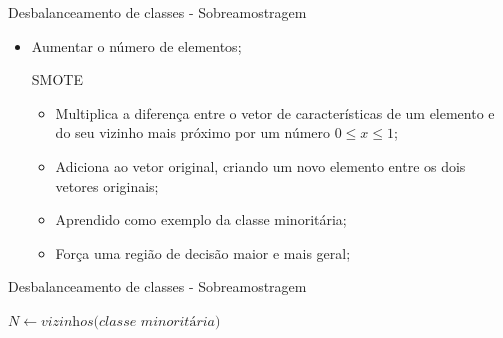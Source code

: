 \documentclass{beamer}
\begin{document}
\begin{frame}{Desbalanceamento de classes - Sobreamostragem}
\setlength\leftmargini{0em}
\justifying
    \begin{itemize}
        \item Aumentar o número de elementos;
    \begin{block}{SMOTE}
\setlength\leftmargini{1em}
        \begin{itemize}
            \item Multiplica a diferença entre o vetor de características de um elemento e do seu vizinho mais próximo por um número $0 \leq x \leq 1$;
            \item Adiciona ao vetor original, criando um novo elemento entre os dois vetores originais;
            \item Aprendido como exemplo da classe minoritária;
            \item Força uma região de decisão maior e mais geral;
        \end{itemize}
    \end{block}
    \end{itemize}
\end{frame}
\begin{frame}{Desbalanceamento de classes - Sobreamostragem}
\setlength\leftmargini{0em}
\footnotesize{
\justifying
\begin{block}{}
  \begin{algorithm}[H]
    \caption{SMOTE: método para rebalancear classes}
    \SetAlgoLined
    $N \gets \textit{vizinhos(classe minoritária)}$\;
  \end{algorithm}
\end{block}
}
\end{frame}
\end{document}
